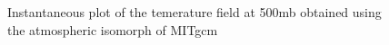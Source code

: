 \begin{figure}
\caption{Instantaneous plot of the temerature field at 500mb 
obtained using the atmospheric isomorph of MITgcm}
\label{fig:eddy_cs}
\end{figure}
